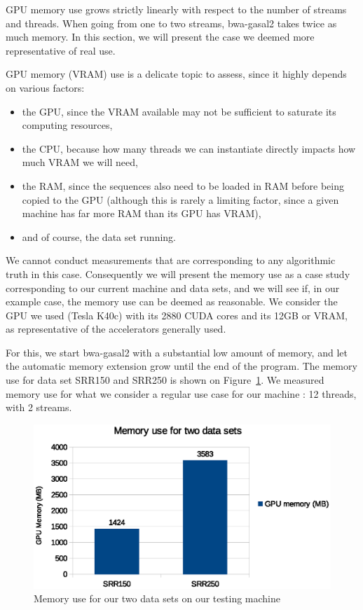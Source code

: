 GPU memory use grows strictly linearly with respect to the number of streams and threads. When going from one to two streams, bwa-gasal2 takes twice as much memory. In this section, we will present the case we deemed more representative of real use.

GPU memory (VRAM) use is a delicate topic to assess, since it highly depends on various factors:

\begin{itemize}
	\item the GPU, since the VRAM available may not be sufficient to saturate its computing resources,
	\item the CPU, because how many threads we can instantiate directly impacts how much VRAM we will need,
	\item the RAM, since the sequences also need to be loaded in RAM before being copied to the GPU (although this is rarely a limiting factor, since a given machine has far more RAM than its GPU has VRAM),
	\item and of course, the data set running.
\end{itemize}

We cannot conduct measurements that are corresponding to any algorithmic truth in this case. Consequently we will present the memory use as a case study corresponding to our current machine and data sets, and we will see if, in our example case, the memory use can be deemed as reasonable. We consider the GPU we used (Tesla K40c) with its 2880 CUDA cores and its 12GB or VRAM, as representative of the accelerators generally used.

For this, we start bwa-gasal2 with a substantial low amount of memory, and let the automatic memory extension grow until the end of the program. The memory use for data set SRR150 and SRR250 is shown on Figure~\ref{fig:memory-use}. We measured memory use for what we consider a regular use case for our machine : 12 threads, with 2 streams. 

\begin{figure}[h]
	\centering
	\includegraphics[width=0.9\linewidth]{memory-use}
	\caption{Memory use for our two data sets on our testing machine}
	\label{fig:memory-use}
\end{figure}

